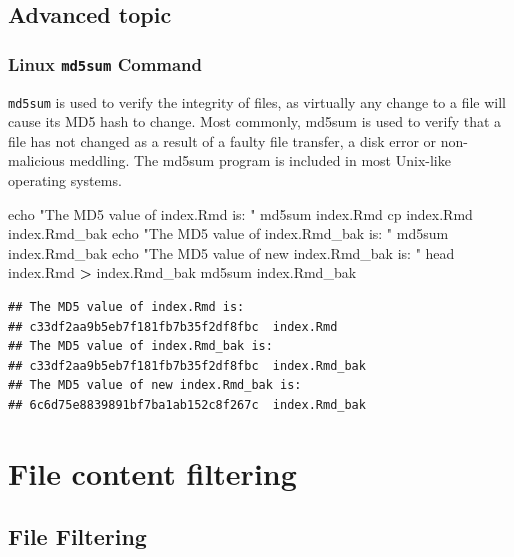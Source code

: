 \documentclass[]{book}
\makeatletter
\newenvironment{Shaded}{\begin{snugshade}}{\end{snugshade}}
\newcommand{\BuiltInTok}[1]{#1}
\newcommand{\ExtensionTok}[1]{#1}
\newcommand{\FunctionTok}[1]{\textcolor[rgb]{0.00,0.00,0.00}{#1}}
\newcommand{\NormalTok}[1]{#1}
\newcommand{\OperatorTok}[1]{\textcolor[rgb]{0.81,0.36,0.00}{\textbf{#1}}}
\newcommand{\StringTok}[1]{\textcolor[rgb]{0.31,0.60,0.02}{#1}}
\newenvironment{kframe}{%
\medskip{}
\setlength{\fboxsep}{.8em}
 \def\at@end@of@kframe{}%
 \ifinner\ifhmode%
  \def\at@end@of@kframe{\end{minipage}}%
  \begin{minipage}{\columnwidth}%
 \fi\fi%
 \def\FrameCommand##1{\hskip\@totalleftmargin \hskip-\fboxsep
 \colorbox{shadecolor}{##1}\hskip-\fboxsep
     \hskip-\linewidth \hskip-\@totalleftmargin \hskip\columnwidth}%
 \MakeFramed {\advance\hsize-\width
   \@totalleftmargin\z@ \linewidth\hsize
   \@setminipage}}%
 {\par\unskip\endMakeFramed%
 \at@end@of@kframe}
\renewenvironment{Shaded}{\begin{kframe}}{\end{kframe}}
\makeatother
\begin{document}
\hypertarget{advanced-topic}{%
\section{Advanced topic}\label{advanced-topic}}

\hypertarget{linux-md5sum-command}{%
\subsection{\texorpdfstring{Linux \texttt{md5sum} Command}{Linux md5sum Command}}\label{linux-md5sum-command}}

\texttt{md5sum} is used to verify the integrity of files, as virtually any change to a file will cause its MD5 hash to change. Most commonly, md5sum is used to verify that a file has not changed as a result of a faulty file transfer, a disk error or non-malicious meddling. The md5sum program is included in most Unix-like operating systems.

\begin{Shaded}
\begin{Highlighting}[]
\BuiltInTok{echo} \StringTok{"The MD5 value of index.Rmd is: "}
\ExtensionTok{md5sum}\NormalTok{ index.Rmd}
\FunctionTok{cp}\NormalTok{ index.Rmd index.Rmd_bak}
\BuiltInTok{echo} \StringTok{"The MD5 value of index.Rmd_bak is: "}
\ExtensionTok{md5sum}\NormalTok{ index.Rmd_bak }
\BuiltInTok{echo} \StringTok{"The MD5 value of new index.Rmd_bak is: "}
\FunctionTok{head}\NormalTok{ index.Rmd }\OperatorTok{>}\NormalTok{ index.Rmd_bak}
\ExtensionTok{md5sum}\NormalTok{ index.Rmd_bak }
\end{Highlighting}
\end{Shaded}

\begin{verbatim}
## The MD5 value of index.Rmd is: 
## c33df2aa9b5eb7f181fb7b35f2df8fbc  index.Rmd
## The MD5 value of index.Rmd_bak is: 
## c33df2aa9b5eb7f181fb7b35f2df8fbc  index.Rmd_bak
## The MD5 value of new index.Rmd_bak is: 
## 6c6d75e8839891bf7ba1ab152c8f267c  index.Rmd_bak
\end{verbatim}

\hypertarget{file-content-filtering}{%
\chapter{File content filtering}\label{file-content-filtering}}

\hypertarget{file-filtering}{%
\section{File Filtering}\label{file-filtering}}
\end{document}
